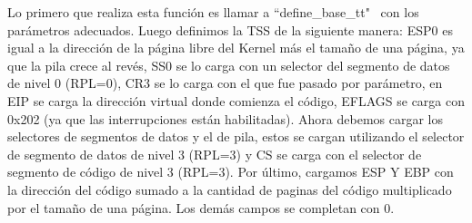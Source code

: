 \documentclass[a4paper]{article}
\begin{document}
\justify
Lo primero que realiza esta función es llamar a  ``define_base_tt" \ con los parámetros adecuados. Luego definimos la TSS de la siguiente manera: ESP0 es igual a la dirección de la página libre del Kernel más el tamaño de una página, ya que la pila crece al revés, SS0 se lo carga con un selector del segmento de datos de nivel 0 (RPL=0), CR3 se lo carga con el que fue pasado por parámetro, en EIP se carga la dirección virtual donde comienza el código, EFLAGS se carga con 0x202 (ya que las interrupciones están habilitadas). Ahora debemos cargar los selectores de segmentos de datos y el de pila, estos se cargan utilizando el selector de segmento de datos de nivel 3 (RPL=3) y CS se carga con el selector de segmento de código de nivel 3 (RPL=3). Por último, cargamos ESP Y EBP con la dirección del código sumado a la cantidad de paginas del código multiplicado por el tamaño de una página. Los demás campos se completan con 0.
\end{document}
